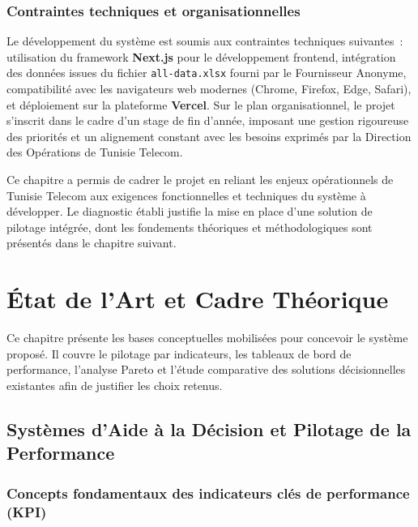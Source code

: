 \documentclass[10pt,a4paper]{report}
\newcommand{\chapintro}[1]{%
  \begin{tcolorbox}[introbox]
    #1
  \end{tcolorbox}%
  \vspace{8pt}%
}
\newcommand{\chapconclusion}[1]{%
  \vspace{8pt}%
  \begin{tcolorbox}[conclusionbox]
    #1
  \end{tcolorbox}%
}
\begin{document}
\subsection{Contraintes techniques et organisationnelles}

Le développement du système est soumis aux contraintes techniques suivantes~: utilisation du framework \textbf{Next.js} pour le développement frontend, intégration des données issues du fichier \texttt{all-data.xlsx} fourni par le Fournisseur Anonyme, compatibilité avec les navigateurs web modernes (Chrome, Firefox, Edge, Safari), et déploiement sur la plateforme \textbf{Vercel}. Sur le plan organisationnel, le projet s'inscrit dans le cadre d'un stage de fin d'année, imposant une gestion rigoureuse des priorités et un alignement constant avec les besoins exprimés par la Direction des Opérations de Tunisie Telecom.

\chapconclusion{%
Ce chapitre a permis de cadrer le projet en reliant les enjeux opérationnels de Tunisie Telecom aux exigences fonctionnelles et techniques du système à développer. Le diagnostic établi justifie la mise en place d'une solution de pilotage intégrée, dont les fondements théoriques et méthodologiques sont présentés dans le chapitre suivant.%
}


\chapter{État de l'Art et Cadre Théorique}

\chapintro{%
Ce chapitre présente les bases conceptuelles mobilisées pour concevoir le système proposé. Il couvre le pilotage par indicateurs, les tableaux de bord de performance, l'analyse Pareto et l'étude comparative des solutions décisionnelles existantes afin de justifier les choix retenus.%
}


\section{Systèmes d'Aide à la Décision et Pilotage de la Performance}

\subsection{Concepts fondamentaux des indicateurs clés de performance (KPI)}
\end{document}
